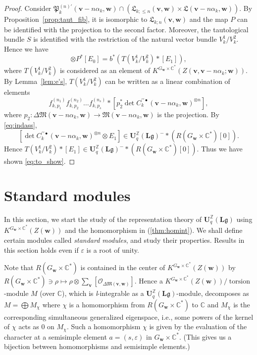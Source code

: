 \documentclass[12pt]{amsart}
\def\Bbb{\mathbb}
\def\frak{\mathfrak}
\theoremstyle{definition}
\theoremstyle{remark}
\numberwithin{equation}{subsection}
\newcommand{\lemref}[1]{Lemma~\ref{#1}}
\newcommand{\propref}[1]{Proposition~\ref{#1}}
\newcommand{\C}{{\Bbb C}}
\newcommand{\Z}{{\Bbb Z}}
\newcommand{\M}{{\frak M}} %
\newcommand{\La}{{\frak L}} %
\newcommand{\bv}{{\mathbf v}} %
\newcommand{\bw}{{\mathbf w}} %
\newcommand{\Uli}{{\mathbf U}^{\Z}_q({\mathbf L}\mathfrak g)}
\newcommand{\Pa}{{\frak P}} %
\newcommand{\shfO}{\mathcal O}
\newcommand{\Zw}{Z(\bw)}
\begin{document}
\begin{proof}
Consider $\Pa_k^{(n)\prime}(\bv-n\alpha_k,\bw)\cap(
\La_{k;\le n}(\bv,\bw)\times\La(\bv-n\alpha_k,\bw))$.
By \propref{prop:taut_fib}, it is isomorphic to $\La_{k;n}(\bv,\bw)$
and the map $P$ can be identified with the projection to the second
factor. Moreover, the tautological bundle $S$ is identified with the
restriction of the natural vector bundle $V_k^1/V_k^2$.
Hence we have
\begin{equation*}
     [T(S)]\otimes P^* [E_0]
   = b^* \left( T(V_k^1/V_k^2) \ast [E_1]\right),
\end{equation*}
where $T(V_k^1/V_k^2)$ is considered as an element of
$K^{G_\bw\times\C^*}(Z(\bv,\bv-n\alpha_k;\bw))$.
By \lemref{lem:e's}, $T(V_k^1/V_k^2)$ can be written as a linear
combination of elements
\begin{equation*}
   f_{k,p_1}^{(n_1)}f_{k,p_2}^{(n_2)}\dots f_{k,p_s}^{(n_s)}\ast
   [p_2^*\det C_k^{\prime\prime\bullet}(\bv-n\alpha_k,\bw)^{\otimes n}],
\end{equation*}
where $p_2\colon \Delta\M(\bv-n\alpha_k,\bw)\to \M(\bv-n\alpha_k,\bw)$ 
is the projection.
By \eqref{eq:indass},
\[
   [\det C_k^{\prime\prime\bullet}(\bv-n\alpha_k,\bw)^{\otimes n}
\otimes E_1]\in \Uli^-\ast\left(R(G_\bw\times\C^*)[0]\right).
\]
Hence $T(V_k^1/V_k^2) \ast [E_1]\in
\Uli^-\ast\left(R(G_\bw\times\C^*)[0]\right)$.
Thus we have shown \eqref{eq:to_show}.
\end{proof}

\section{Standard modules}\label{sec:std}

In this section, we start the study of the representation theory of
$\Uli$ using $K^{G_\bw\times\C^*}(\Zw)$ and
the homomorphism in (\ref{thm:homint}). We shall define certain
modules called {\it standard modules}, and study their properties.
%
Results in this section holds even if $\varepsilon$ is a root of unity.

Note that $R(G_\bw\times\C^*)$ is contained in the center of
$K^{G_\bw\times\C^*}(\Zw)$ by $R(G_\bw\times\C^*)\ni \rho \mapsto
\rho\otimes\sum_\bv [\shfO_{\Delta\M(\bv,\bw)}]$. Hence a
$K^{G_\bw\times\C^*}(\Zw)/\!\operatorname{torsion}$-module $M$ (over
$\C$), which is {\it l\/}-integrable as a $\Uli$-module, decomposes as
$M = \bigoplus M_\chi$ where $\chi$ is a homomorphism from
$R(G_\bw\times\C^*)$ to $\C$ and $M_\chi$ is the corresponding
simultaneous generalized eigenspace, i.e., some powers of the kernel
of $\chi$ acts as $0$ on $M_\chi$.
%
Such a homomorphism $\chi$ is given by the evaluation of the character
at a semisimple element $a = (s,\varepsilon)$ in
$G_\bw\times\C^*$. (This gives us a bijection between homomorphisms and
semisimple elements.)
\end{document}
